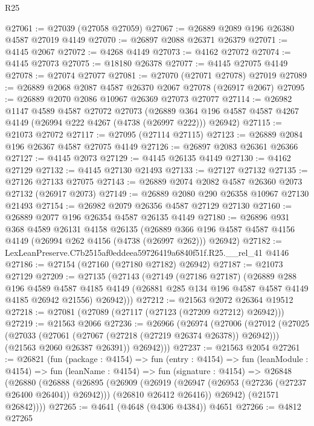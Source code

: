 \begin{lexlean}{R25}
\begin{coremodule}
@27061 := @27039 (@27058 @27059)
@27067 := @26889 @2089 @196 @26380 @4587 @27019 @4149
@27070 := @26897 @2088 @26371 @26379
@27071 := @4145 @2067
@27072 := @4268 @4149
@27073 := @4162 @27072
@27074 := @4145 @27073
@27075 := @18180 @26378
@27077 := @4145 @27075 @4149
@27078 := @27074 @27077
@27081 := @27070 (@27071 @27078) @27019
@27089 := @26889 @2068 @2087 @4587 @26370 @2067 @27078 (@26917 @2067)
@27095 := @26889 @2070 @2086 @10967 @26369 @27073 @27077
@27114 := @26982
    @1147
    @4589
    @4587
    @27072
    @27073
    (@26889 @364 @196 @4587 @4587 @4267 @4149 (@26994 @222 @4267 (@4738 (@26997 @222))) @26942)
@27115 := @21073 @27072
@27117 := @27095 (@27114 @27115)
@27123 := @26889 @2084 @196 @26367 @4587 @27075 @4149
@27126 := @26897 @2083 @26361 @26366
@27127 := @4145 @2073
@27129 := @4145 @26135 @4149
@27130 := @4162 @27129
@27132 := @4145 @27130 @21493
@27133 := @27127 @27132
@27135 := @27126 @27133 @27075
@27143 := @26889 @2074 @2082 @4587 @26360 @2073 @27132 (@26917 @2073)
@27149 := @26889 @2080 @290 @26358 @10967 @27130 @21493
@27154 := @26982 @2079 @26356 @4587 @27129 @27130
@27160 := @26889 @2077 @196 @26354 @4587 @26135 @4149
@27180 := @26896
    @931
    @368
    @4589
    @26131
    @4158
    @26135
    (@26889 @366 @196 @4587 @4587 @4156 @4149 (@26994 @262 @4156 (@4738 (@26997 @262))) @26942)
@27182 := LexLeanPreserve.C7b2515af0eddeea59726419a6840f51f.R25.__rel_41 @4146
@27186 := @27154 (@27160 (@27180 @27182) @26942)
@27187 := @21073 @27129
@27209 := @27135
    (@27143
      (@27149
        (@27186 @27187)
        (@26889
          @288
          @196
          @4589
          @4587
          @4185
          @4149
          (@26881 @285 @134 @196 @4587 @4587 @4149 @4185 @26942 @21556)
          @26942)))
@27212 := @21563 @2072 @26364 @19512
@27218 := @27081 (@27089 (@27117 (@27123 (@27209 @27212) @26942)))
@27219 := @21563 @2066
@27236 := @26966
    (@26974
      (@27006
        (@27012
          (@27025
            (@27033 (@27061 (@27067 (@27218 (@27219 @26374 @26378)) @26942)))
            (@21563 @2060 @26387 @26391))
          @26942)))
@27237 := @21563 @2054
@27261 := @26821
    (fun (package : @4154) =>
    fun (entry : @4154) =>
    fun (leanModule : @4154) =>
    fun (leanName : @4154) =>
    fun (signature : @4154) =>
    @26848
      (@26880
        (@26888
          (@26895
            (@26909
              (@26919 (@26947 (@26953 (@27236 (@27237 @26400 @26404)) @26942)))
              (@26810 @26412 @26416))
            @26942)
          (@21571 @26842))))
@27265 := @4641 (@4648 (@4306 @4384)) @4651
@27266 := @4812 @27265

\end{coremodule}
\end{lexlean}

